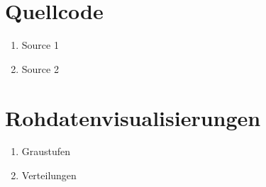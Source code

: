 \documentclass[11pt, a4paper, headinclude, footinclude=true, oneside]{scrreprt}
\author{Nicolas Harrje} %
\begin{document}






%

\clearpage
\makeatletter
\renewcommand*{\@dotsep}{1} %
\makeatother
\tableofcontents

\cleardoublepage
{}







\nocite{Segmentation} %
\nocite{ImageAttack}

\clearpage
%



\clearpage
{}


\clearpage
{}
\listoffigures

\clearpage
{}
\listoftables
{}

\appendix
%
\chapter{Quellcode}
\begin{enumerate}
      \item Source 1
      \item Source 2
\end{enumerate}



\chapter{Rohdatenvisualisierungen}
\begin{enumerate}
      \item Graustufen
      \item Verteilungen
\end{enumerate}
\end{document}
